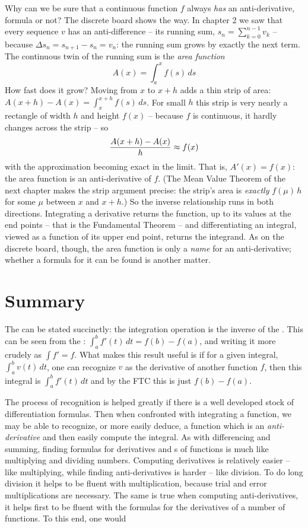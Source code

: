 Why can we be sure that a continuous function $f$ always {\it has\/} an anti-derivative, formula or not?
The discrete board shows the way. In chapter 2 we saw that every sequence $v$ has an anti-difference -- its
running sum, $s_n = \sum_{k=0}^{n-1} v_k$ -- because $\Delta s_n = s_{n+1} - s_n = v_n$: the running sum
grows by exactly the next term. The continuous twin of the running sum is the {\it area function\/}
$$
A(x) = \int_a^x f(s) \, ds
$$
How fast does it grow? Moving from $x$ to $x + h$ adds a thin strip of area:
$A(x+h) - A(x) = \int_x^{x+h} f(s)\, ds$. For small $h$ this strip is very nearly a rectangle of width $h$
and height $f(x)$ -- because $f$ is continuous, it hardly changes across the strip -- so
$$
{A(x+h) - A(x) \over h} \approx f(x)
$$
with the approximation becoming exact in the limit. That is, $A'(x) = f(x)$: the area function is an
anti-derivative of $f$. (The Mean Value Theorem of the next chapter makes the strip argument precise: the
strip's area is {\it exactly\/} $f(\mu)\, h$ for some $\mu$ between $x$ and $x+h$.) So the inverse
relationship runs in both directions. Integrating a derivative returns the function, up to its values at
the end points -- that is the Fundamental Theorem -- and differentiating an integral, viewed as a function
of its upper end point, returns the integrand. As on the discrete board, though, the area function is only
a {\it name\/} for an anti-derivative; whether a formula for it can be found is another matter.
 
\section{Summary}
The  can be stated succinctly:  
the integration operation is the 
inverse of the . This can be seen from the :
$\int_{a}^b f'(t) \, dt = f(b) - f(a)$, and writing it more crudely as $\int f' = f$. What makes 
this result useful is if for a given integral, $\int_{a}^b v(t)\, dt$, one can recognize $v$ as
the derivative of another function $f$, then this integral is 
$\int_{a}^b f'(t)\, dt$ and by the FTC this is just $f(b) - f(a)$.

The process of recognition is helped greatly if there is a well developed stock of differentiation formulas. 
Then when confronted with integrating a function, we may be able to recognize, or more easily deduce, 
a function which
is an {\it anti-derivative\/} and then easily compute the integral. As with differencing and summing, finding
formulas for derivatives and s of functions is much like multiplying and dividing numbers. 
Computing derivatives is relatively easier -- like multiplying, while finding 
anti-derivatives is harder -- like division. To 
do long division it helps to be fluent with multiplication, because trial and error multiplications are
necessary. The same is true when computing anti-derivatives, it helps first to be fluent with the formulas for
the derivatives of a number of functions. To this end, one would
\beginEnum
{}
\endEnum

